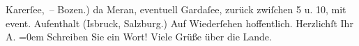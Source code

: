 \begin{ledgroupsized}[t]{13cm}
                  Karerſee, – Bozen.) da{\geminationn}{ }Meran, eventuell Gardaſee, zurück zwiſchen 5 u. 10, mit event.
               Aufenthalt (I{\geminationn}sbruck,
                  Salzburg.) Auf Wiederſehen hoffentlich.\pend
           \pstart
           Herzlichſt Ihr{\\[\baselineskip]}\spacefill\mbox{A.}\pend
           \leftskip=0em{}\pstart
           \noindent{}Schreiben Sie ein Wort! Viele Grüße über die Lande.\pend
                     \endnumbering{}\end{ledgroupsized}  \newcommand{\dateiname}{L01700}\newcommand{\titel}{Arthur Schnitzler an Richard Beer-Hofmann, 19. 8. 1907}\newcommand{\editorInnen}{Martin Anton Müller und Gerd-Hermann Susen}
            \footnotesize
\begin{ledgroupsized}[t]{11.5cm}
\end{ledgroupsized}
         
      